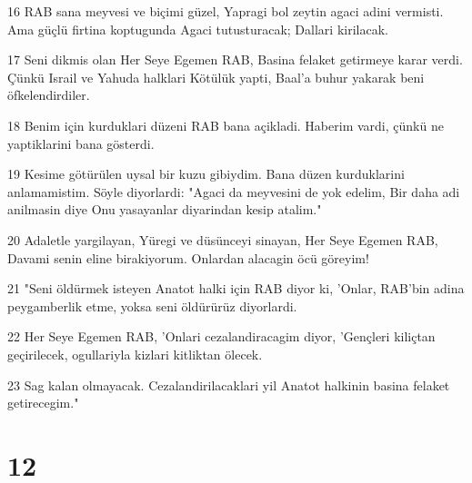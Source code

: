 \par 16 RAB sana meyvesi ve biçimi güzel, Yapragi bol zeytin agaci adini vermisti. Ama güçlü firtina koptugunda Agaci tutusturacak; Dallari kirilacak.
\par 17 Seni dikmis olan Her Seye Egemen RAB, Basina felaket getirmeye karar verdi. Çünkü Israil ve Yahuda halklari Kötülük yapti, Baal'a buhur yakarak beni öfkelendirdiler.
\par 18 Benim için kurduklari düzeni RAB bana açikladi. Haberim vardi, çünkü ne yaptiklarini bana gösterdi.
\par 19 Kesime götürülen uysal bir kuzu gibiydim. Bana düzen kurduklarini anlamamistim. Söyle diyorlardi: "Agaci da meyvesini de yok edelim, Bir daha adi anilmasin diye Onu yasayanlar diyarindan kesip atalim."
\par 20 Adaletle yargilayan, Yüregi ve düsünceyi sinayan, Her Seye Egemen RAB, Davami senin eline birakiyorum. Onlardan alacagin öcü göreyim!
\par 21 "Seni öldürmek isteyen Anatot halki için RAB diyor ki, 'Onlar, RAB'bin adina peygamberlik etme, yoksa seni öldürürüz diyorlardi.
\par 22 Her Seye Egemen RAB, 'Onlari cezalandiracagim diyor, 'Gençleri kiliçtan geçirilecek, ogullariyla kizlari kitliktan ölecek.
\par 23 Sag kalan olmayacak. Cezalandirilacaklari yil Anatot halkinin basina felaket getirecegim."

\chapter{12}

